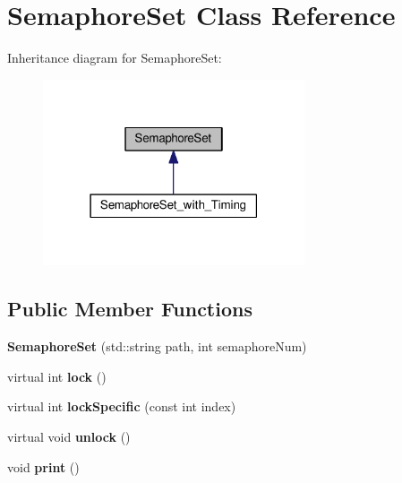\hypertarget{classSemaphoreSet}{}\section{Semaphore\+Set Class Reference}
\label{classSemaphoreSet}


Inheritance diagram for Semaphore\+Set\+:
\nopagebreak
\begin{figure}[H]
\begin{center}
\leavevmode
\includegraphics[width=219pt]{classSemaphoreSet__inherit__graph}
\end{center}
\end{figure}
\subsection*{Public Member Functions}
\begin{DoxyCompactItemize}
\item 
{\bfseries Semaphore\+Set} (std\+::string path, int semaphore\+Num)\hypertarget{classSemaphoreSet_a6027ad2c747297e727be26e4eabe2fa8}{}\label{classSemaphoreSet_a6027ad2c747297e727be26e4eabe2fa8}

\item 
virtual int {\bfseries lock} ()\hypertarget{classSemaphoreSet_a466e8fbc146c9fce6a2e81aceaff79c7}{}\label{classSemaphoreSet_a466e8fbc146c9fce6a2e81aceaff79c7}

\item 
virtual int {\bfseries lock\+Specific} (const int index)\hypertarget{classSemaphoreSet_a3624d9c3402e790f3bcd8f2a5f28fa52}{}\label{classSemaphoreSet_a3624d9c3402e790f3bcd8f2a5f28fa52}

\item 
virtual void {\bfseries unlock} ()\hypertarget{classSemaphoreSet_a8205a491451929feac9494341fa870a3}{}\label{classSemaphoreSet_a8205a491451929feac9494341fa870a3}

\item 
void {\bfseries print} ()\hypertarget{classSemaphoreSet_af02b517be7efef6c5baebcf75391d757}{}\label{classSemaphoreSet_af02b517be7efef6c5baebcf75391d757}

\end{DoxyCompactItemize}
